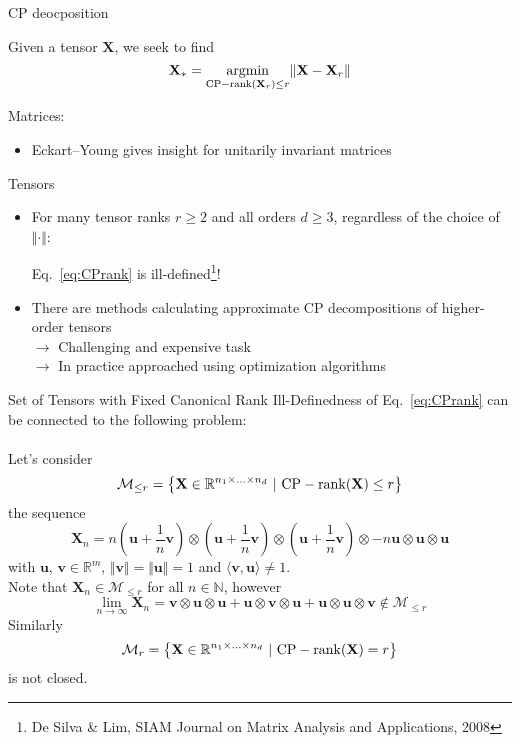 \documentclass{beamer}
\newcommand{\bvec}[1]{\mathbf{#1}}
\newcommand{\vu}{\bvec{u}}
\newcommand{\vv}{\bvec{v}}
\newcommand{\vX}{\bvec{X}}
\newcommand{\bitem}{\item[$\bullet$]}
\begin{document}
\begin{frame}{CP deocposition}


Given a tensor $\vX$, we seek to find 
\begin{equation}
\label{eq:CPrank}
\vX_*
=
\underset{{\rm CP-rank}(\vX_r) \leq r}{\rm argmin} \Vert \vX - \vX_r \Vert
\end{equation}

Matrices:
\begin{itemize}
    \bitem Eckart--Young gives insight for unitarily invariant matrices
\end{itemize}

Tensors
\begin{itemize}
    \bitem For many tensor ranks $r\geq 2$ and all orders $d\geq 3$, regardless of the choice of $\Vert \cdot \Vert $:\\
    \begin{center}
    Eq.~\eqref{eq:CPrank} is ill-defined\footnote{De Silva \& Lim, SIAM Journal on Matrix Analysis and Applications, 2008}!
    \end{center}
    \bitem There are methods calculating approximate CP decompositions of higher-order tensors\\
    $\rightarrow$ Challenging and expensive task\\ 
    $\rightarrow$ In practice approached using optimization algorithms
\end{itemize}


\end{frame}

\begin{frame}{Set of Tensors with Fixed Canonical Rank}
Ill-Definedness of Eq.~\eqref{eq:CPrank} can be connected to the following problem:\\
~\\
Let's consider 
\begin{equation*}
\mathcal{M}_{\leq r}
=
\left\lbrace
\vX \in \mathbb{R}^{n_1 \times ... \times n_d}~|~
{\rm CP-rank} (\vX) \leq r
\right\rbrace
\end{equation*}
the sequence
$$
\vX_n
=n
\left(
\vu + \frac{1}{n} \vv
\right)
\otimes 
\left(
\vu + \frac{1}{n} \vv
\right)
\otimes 
\left(
\vu + \frac{1}{n} \vv
\right)
\otimes 
-
n \vu \otimes \vu \otimes \vu 
$$
with $\vu$, $\vv \in\mathbb{R}^m$, $\Vert \vv \Vert = \Vert \vu \Vert =1$ and $\langle \vv, \vu \rangle \neq 1$.\\
\pause
Note that $\vX_n \in \mathcal{M}_{\leq r}$ for all $n\in\mathbb{N}$, however
$$
\lim_{n\to \infty} \vX_n 
=
\vv \otimes \vu \otimes \vu +
\vu \otimes \vv \otimes \vu +
\vu \otimes \vu \otimes \vv
\notin \mathcal{M}_{\leq r}
$$
\pause
Similarly 
\begin{equation*}
\mathcal{M}_{r}
=
\left\lbrace
\vX \in \mathbb{R}^{n_1 \times ... \times n_d}~|~
{\rm CP-rank} (\vX) = r
\right\rbrace
\end{equation*}
is not closed.

\end{frame}
\end{document}
